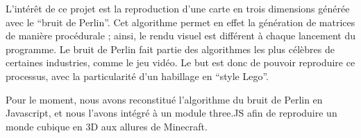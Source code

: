 L'intérêt de ce projet est la reproduction d'une carte en trois dimensions générée avec le "`bruit de Perlin"'. 
Cet algorithme permet en effet la génération de matrices de manière procédurale ; ainsi, le rendu visuel est différent à chaque lancement du programme. Le bruit de Perlin fait partie des algorithmes les plus célèbres de certaines industries, comme le jeu vidéo. Le but est donc de pouvoir reproduire ce processus, avec la particularité d'un habillage en "`style Lego"'.

Pour le moment, nous avons reconstitué l'algorithme du bruit de Perlin en Javascript, et nous l'avons intégré à un module three.JS afin de reproduire un monde cubique en 3D aux allures de Minecraft.
